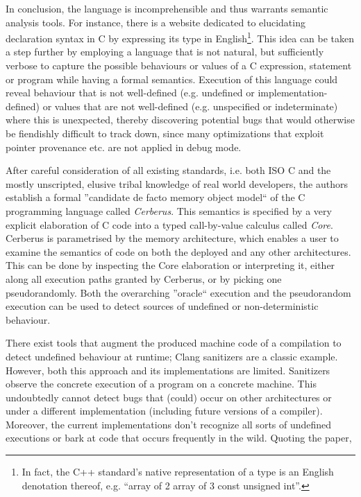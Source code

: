 \documentclass[12pt]{article}
\begin{document}
In conclusion, the language is incomprehensible and thus warrants semantic analysis tools. For instance, there is a website dedicated to elucidating declaration syntax in C \cite{2} by expressing its type in English\footnote{In fact, the C++ standard's native representation of a type is an English denotation thereof, e.g. ``array of 2 array of 3 const unsigned int''.}. This idea can be taken a step further by employing a language that is not natural, but sufficiently verbose to capture the possible behaviours or values of a C expression, statement or program while having a formal semantics. Execution of this language could reveal behaviour that is not well-defined (e.g. undefined or implementation-defined) or values that are not well-defined (e.g. unspecified or indeterminate) where this is unexpected, thereby discovering potential bugs that would otherwise be fiendishly difficult to track down, since many optimizations that exploit pointer provenance etc. are not applied in debug mode.

After careful consideration of all existing standards, i.e. both ISO C and the mostly unscripted, elusive tribal knowledge of real world developers, the authors establish a formal ''candidate de facto memory object model`` of the C programming language called \emph{Cerberus}. This semantics is specified by a very explicit elaboration of C code into a typed call-by-value calculus called \emph{Core}. Cerberus is parametrised by the memory architecture, which enables a user to examine the semantics of code on both the deployed and any other architectures. This can be done by inspecting the Core elaboration or interpreting it, either along all execution paths granted by Cerberus, or by picking one pseudorandomly. Both the overarching ''oracle`` execution and the pseudorandom execution can be used to detect sources of undefined or non-deterministic behaviour.

There exist tools that augment the produced machine code of a compilation to detect undefined behaviour at runtime; Clang sanitizers\cite{3} are a classic example. However, both this approach and its implementations are limited. Sanitizers observe the concrete execution of a program on a concrete machine. This undoubtedly cannot detect bugs that (could) occur on other architectures or under a different implementation (including future versions of a compiler). Moreover, the current implementations don't recognize all sorts of undefined executions or bark at code that occurs frequently in the wild. Quoting the paper,
\end{document}
